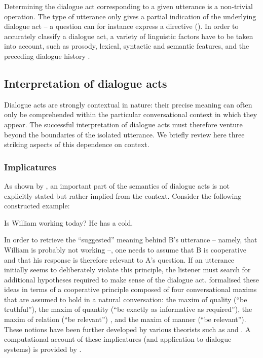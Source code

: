 Determining the dialogue act corresponding to a given utterance is a non-trivial operation. The type of utterance only gives a partial indication of the underlying dialogue act -- a question can for instance express a directive ().  In order to accurately classify a dialogue act, a variety of linguistic factors have to be taken into account, such as prosody, lexical, syntactic and semantic features, and the preceding dialogue history \citep{jurafsky1998,Shriberg1998,stolcke2000,Keizer2007}.

\subsection{Interpretation of dialogue acts} 

Dialogue acts are strongly contextual in nature: their precise meaning can often only be comprehended within the particular conversational context in which they appear. The successful interpretation  of dialogue acts must therefore venture beyond the boundaries of the isolated utterance. We briefly review here three striking aspects of this dependence on context.

\subsubsection*{Implicatures}
As shown by \cite{Grice1989}, an important part of the semantics of dialogue acts is not explicitly stated but rather implied from the context.  Consider the following constructed example: 
\begin{center}
\begin{dialogue}
 Is William working today?
 He has a cold.
\end{dialogue}
\end{center}
In order to retrieve the ``suggested'' meaning behind B's utterance -- namely, that William is probably not working --, one needs to assume that B is cooperative and that his response is therefore relevant to A's question.  If an utterance initially seems to deliberately violate this principle, the listener must search for additional hypotheses required to make sense of the dialogue act. \cite{Grice1989} formalised these ideas in terms of a cooperative principle composed of four conversational maxims that are assumed to hold in a natural conversation: the maxim of quality (``be truthful''), the maxim of quantity (``be exactly as informative as required''), the maxim of relation (``be relevant'') , and the maxim of manner (``be relevant'').  These notions have been further developed by various theorists such as \cite{wilson2002relevance} and \cite{horn2008handbook}.  A computational account of these implicatures (and application to dialogue systems) is provided by \cite{benotti2010implicature}. 


